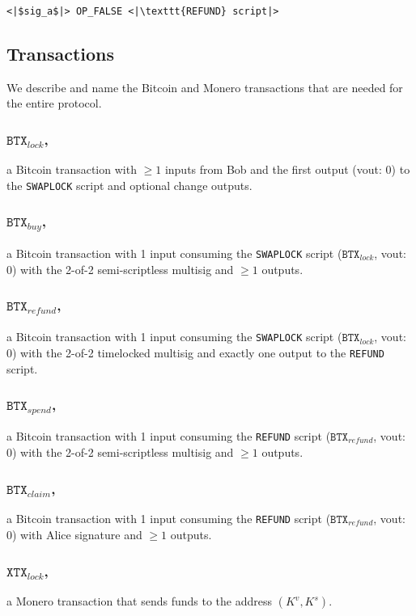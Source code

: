 \documentclass{llncs}
\newcommand{\BTX}{\texttt{BTX}}
\newcommand{\XTX}{\texttt{XTX}}
\begin{document}
\begin{verbatim}
<|$sig_a$|> OP_FALSE <|\texttt{REFUND} script|>
\end{verbatim}

\subsection{Transactions}
We describe and name the Bitcoin and Monero transactions that are needed for the entire protocol.

\subsubsection{$\BTX_\textit{lock}$,}
a Bitcoin transaction with $\geq 1$ inputs from Bob and the first output (vout: 0) to the \texttt{SWAPLOCK} script and optional change outputs.

\subsubsection{$\BTX_\textit{buy}$,}
a Bitcoin transaction with 1 input consuming the \texttt{SWAPLOCK} script ($\BTX_\textit{lock}$, vout: 0) with the 2-of-2 semi-scriptless multisig and $\geq 1$ outputs.

\subsubsection{$\BTX_\textit{refund}$,}
a Bitcoin transaction with 1 input consuming the \texttt{SWAPLOCK} script ($\BTX_\textit{lock}$, vout: 0) with the 2-of-2 timelocked multisig and exactly one output to the \texttt{REFUND} script.

\subsubsection{$\BTX_\textit{spend}$,}
a Bitcoin transaction with 1 input consuming the \texttt{REFUND} script ($\BTX_\textit{refund}$, vout: 0) with the 2-of-2 semi-scriptless multisig and $\geq 1$ outputs.

\subsubsection{$\BTX_\textit{claim}$,}
a Bitcoin transaction with 1 input consuming the \texttt{REFUND} script ($\BTX_\textit{refund}$, vout: 0) with Alice signature and $\geq 1$ outputs.

\subsubsection{$\XTX_\textit{lock}$,}
a Monero transaction that sends funds to the address $(K^v,K^s)$.
\end{document}
